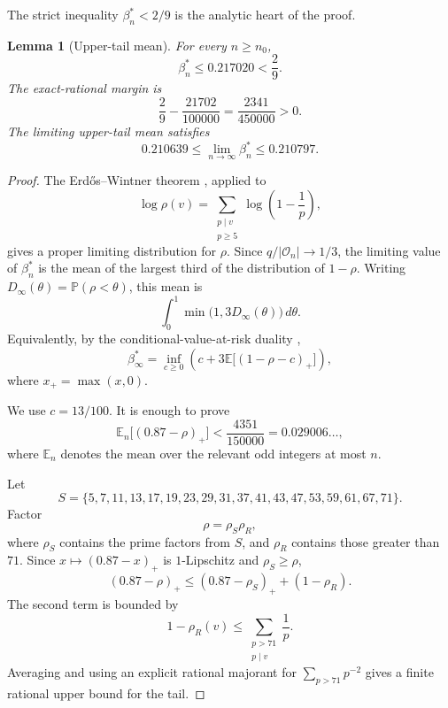 \documentclass{article}
\newtheorem{lemma}[theorem]{Lemma}
\theoremstyle{remark}
\newcommand{\Ocal}{\mathcal{O}}
\begin{document}
The strict inequality \(\beta^\ast_n<2/9\) is the analytic heart of the
proof.

\begin{lemma}[Upper-tail mean]\label{lem:mean}
For every \(n\geq n_0\),
\begin{equation}\label{eq:mean-bound}
 \beta^\ast_n\leq0.217020<\frac29.
\end{equation}
The exact-rational margin is
\[
 \frac29-\frac{21702}{100000}
 =\frac{2341}{450000}>0.
\]
The limiting upper-tail mean satisfies
\[
 0.210639
 \leq
 \lim_{n\to\infty}\beta^\ast_n
 \leq
 0.210797.
\]
\end{lemma}

\begin{proof}
The Erdős--Wintner theorem \cite{EW39}, applied to
\[
 \log\rho(v)
 =
 \sum_{\substack{p\mid v\\p\geq5}}
 \log\left(1-\frac1p\right),
\]
gives a proper limiting distribution for \(\rho\). Since
\(q/|\Ocal_n|\to1/3\), the limiting value of \(\beta^\ast_n\) is the
mean of the largest third of the distribution of \(1-\rho\). Writing
\(D_\infty(\theta)=\mathbb P(\rho<\theta)\), this mean is
\begin{equation}\label{eq:cvar-integral}
 \int_0^1\min\bigl(1,3D_\infty(\theta)\bigr)\,d\theta.
\end{equation}
Equivalently, by the conditional-value-at-risk duality
\cite{RU00},
\begin{equation}\label{eq:cvar-dual}
 \beta^\ast_\infty
 =
 \inf_{c\geq0}
 \left(
  c+3\mathbb E\bigl[(1-\rho-c)_+\bigr]
 \right),
\end{equation}
where \(x_+=\max(x,0)\).

We use \(c=13/100\). It is enough to prove
\begin{equation}\label{eq:hinge-target}
 \mathbb E_n\bigl[(0.87-\rho)_+\bigr]
 <
 \frac{4351}{150000}
 =
 0.029006\ldots,
\end{equation}
where \(\mathbb E_n\) denotes the mean over the relevant odd integers
at most \(n\).

Let
\[
 S=\{5,7,11,13,17,19,23,29,31,37,41,43,47,53,59,61,67,71\}.
\]
Factor
\[
 \rho=\rho_S\rho_R,
\]
where \(\rho_S\) contains the prime factors from \(S\), and \(\rho_R\)
contains those greater than \(71\). Since \(x\mapsto(0.87-x)_+\) is
\(1\)-Lipschitz and \(\rho_S\geq\rho\),
\begin{equation}\label{eq:small-large}
 (0.87-\rho)_+
 \leq
 (0.87-\rho_S)_++(1-\rho_R).
\end{equation}
The second term is bounded by
\[
 1-\rho_R(v)
 \leq
 \sum_{\substack{p>71\\p\mid v}}\frac1p.
\]
Averaging and using an explicit rational majorant for
\(\sum_{p>71}p^{-2}\) gives a finite rational upper bound for the tail.


\end{proof}
\end{document}
